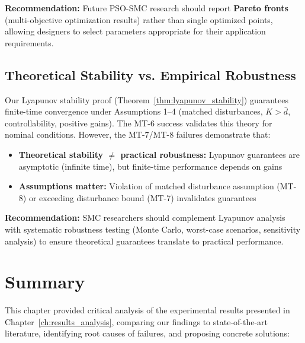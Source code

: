 \textbf{Recommendation:} Future PSO-SMC research should report \textbf{Pareto fronts} (multi-objective optimization results) rather than single optimized points, allowing designers to select parameters appropriate for their application requirements.

\subsection{Theoretical Stability vs. Empirical Robustness}
\label{subsec:theory_vs_practice}

Our Lyapunov stability proof (Theorem~\ref{thm:lyapunov_stability}) guarantees finite-time convergence under Assumptions 1--4 (matched disturbances, $K > \bar{d}$, controllability, positive gains). The MT-6 success validates this theory for nominal conditions. However, the MT-7/MT-8 failures demonstrate that:
\begin{itemize}
    \item \textbf{Theoretical stability $\neq$ practical robustness:} Lyapunov guarantees are asymptotic (infinite time), but finite-time performance depends on gains
    \item \textbf{Assumptions matter:} Violation of matched disturbance assumption (MT-8) or exceeding disturbance bound (MT-7) invalidates guarantees
\end{itemize}

\textbf{Recommendation:} SMC researchers should complement Lyapunov analysis with systematic robustness testing (Monte Carlo, worst-case scenarios, sensitivity analysis) to ensure theoretical guarantees translate to practical performance.

\section{Summary}
\label{sec:chapter8_summary}

This chapter provided critical analysis of the experimental results presented in Chapter~\ref{ch:results_analysis}, comparing our findings to state-of-the-art literature, identifying root causes of failures, and proposing concrete solutions:

